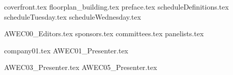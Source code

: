 \documentclass[8pt]{extreport} %
\newlength{\bleed}
\begin{document}
%
\fancyhfoffset[E,O]{0pt}
%
{coverfront.tex}         %
{floorplan_building.tex}
{preface.tex}
{scheduleDefinitions.tex}
\newcommand{\talk}[1]{}
\newcommand{\pagelabel}{\normalsize \textbf{Page}}
\newcommand{\onlyBook}[1]{#1}
\newcommand{\onlyProgram}[1]{}
{scheduleTuesday.tex}\newpage
{scheduleWednesday.tex}\newpage
\restoregeometry

 \label{contents:Introduction}
{AWEC00_Editors.tex}
{sponsors.tex}
{committees.tex}
{panelists.tex}


 \label{contents:Abstracts}
\vspace*{5pt} %
{company01.tex}
{AWEC01_Presenter.tex}

{AWEC03_Presenter.tex}
{AWEC05_Presenter.tex}
\end{document}
